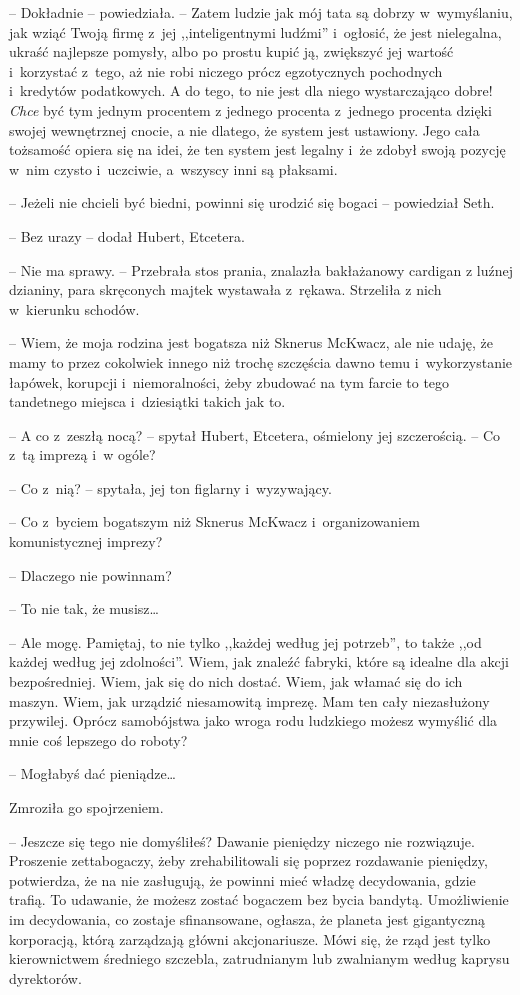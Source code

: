 \documentclass[oneside,polish,11pt,sfheadings]{mwbk}
\begin{document}
-- Dokładnie -- powiedziała. -- Zatem ludzie jak mój tata są dobrzy w~wymyślaniu, jak wziąć Twoją firmę z~jej ,,inteligentnymi ludźmi'' i~ogłosić, że jest nielegalna, ukraść najlepsze pomysły, albo po prostu
kupić ją, zwiększyć jej wartość i~korzystać z~tego, aż nie robi niczego
prócz egzotycznych pochodnych i~kredytów podatkowych. A do tego, to nie
jest dla niego wystarczająco dobre! \textit{Chce} być tym jednym procentem
z jednego procenta z~jednego procenta dzięki swojej wewnętrznej cnocie,
a nie dlatego, że system jest ustawiony. Jego cała tożsamość opiera się
na idei, że ten system jest legalny i~że zdobył swoją pozycję w~nim
czysto i~uczciwie, a~wszyscy inni są płaksami.

-- Jeżeli nie chcieli być biedni, powinni się urodzić się bogaci -- powiedział Seth.

-- Bez urazy -- dodał Hubert, Etcetera.

-- Nie ma sprawy. -- Przebrała stos prania, znalazła bakłażanowy cardigan
z luźnej dzianiny, para skręconych majtek wystawała z~rękawa. Strzeliła
z nich w~kierunku schodów. 

-- Wiem, że moja rodzina jest bogatsza niż
Sknerus McKwacz, ale nie udaję, że mamy to przez cokolwiek innego niż
trochę szczęścia dawno temu i~wykorzystanie łapówek, korupcji i~niemoralności, żeby zbudować na tym farcie to tego tandetnego miejsca i~dziesiątki takich jak to.

-- A co z~zeszłą nocą? -- spytał Hubert, Etcetera, ośmielony jej
szczerością. -- Co z~tą imprezą i~w ogóle?

-- Co z~nią? -- spytała, jej ton figlarny i~wyzywający.

-- Co z~byciem bogatszym niż Sknerus McKwacz i~organizowaniem
komunistycznej imprezy?

-- Dlaczego nie powinnam?

-- To nie tak, że musisz\ldots 

-- Ale mogę. Pamiętaj, to nie tylko ,,każdej według jej potrzeb'', to
także ,,od każdej według jej zdolności''. Wiem, jak znaleźć fabryki,
które są idealne dla akcji bezpośredniej. Wiem, jak się do nich dostać.
Wiem, jak włamać się do ich maszyn. Wiem, jak urządzić niesamowitą
imprezę. Mam ten cały niezasłużony przywilej. Oprócz samobójstwa jako
wroga rodu ludzkiego możesz wymyślić dla mnie coś lepszego do roboty?

-- Mogłabyś dać pieniądze\ldots 

Zmroziła go spojrzeniem. 

-- Jeszcze się tego nie domyśliłeś? Dawanie
pieniędzy niczego nie rozwiązuje. Proszenie zettabogaczy, żeby
zrehabilitowali się poprzez rozdawanie pieniędzy, potwierdza, że na nie
zasługują, że powinni mieć władzę decydowania, gdzie trafią. To
udawanie, że możesz zostać bogaczem bez bycia bandytą. Umożliwienie im
decydowania, co zostaje sfinansowane, ogłasza, że planeta jest
gigantyczną korporacją, którą zarządzają główni akcjonariusze. Mówi się,
że rząd jest tylko kierownictwem średniego szczebla, zatrudnianym lub
zwalnianym według kaprysu dyrektorów.
\end{document}
